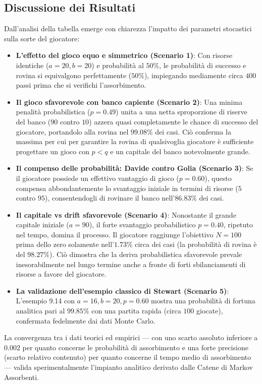 \documentclass[11pt,a4paper]{article}
\begin{document}
\subsection{Discussione dei Risultati}
Dall'analisi della tabella emerge con chiarezza l'impatto dei parametri stocastici sulla sorte del giocatore:
\begin{itemize}
    \item \textbf{L'effetto del gioco equo e simmetrico (Scenario 1)}: Con risorse identiche ($a=20, b=20$) e probabilità al $50\%$, le probabilità di successo e rovina si equivalgono perfettamente ($50\%$), impiegando mediamente circa $400$ passi prima che si verifichi l'assorbimento.
    \item \textbf{Il gioco sfavorevole con banco capiente (Scenario 2)}: Una minima penalità probabilistica ($p=0.49$) unita a una netta sproporzione di riserve del banco ($90$ contro $10$) azzera quasi completamente le chance di successo del giocatore, portandolo alla rovina nel $99.08\%$ dei casi. Ciò conferma la massima per cui per garantire la rovina di qualsivoglia giocatore è sufficiente progettare un gioco con $p < q$ e un capitale del banco notevolmente grande.
    \item \textbf{Il compenso delle probabilità: Davide contro Golia (Scenario 3)}: Se il giocatore possiede un effettivo vantaggio di gioco ($p=0.60$), questo compensa abbondantemente lo svantaggio iniziale in termini di risorse ($5$ contro $95$), consentendogli di rovinare il banco nell'$86.83\%$ dei casi.
    \item \textbf{Il capitale vs drift sfavorevole (Scenario 4)}: Nonostante il grande capitale iniziale ($a=90$), il forte svantaggio probabilistico $p=0.40$, ripetuto nel tempo, domina il processo. Il giocatore raggiunge l'obiettivo $N=100$ prima dello zero solamente nell'$1.73\%$ circa dei casi (la probabilità di rovina è del $98.27\%$). Ciò dimostra che la deriva probabilistica sfavorevole prevale inesorabilmente nel lungo termine anche a fronte di forti sbilanciamenti di risorse a favore del giocatore.
    \item \textbf{La validazione dell'esempio classico di Stewart (Scenario 5)}: L'esempio 9.14 con $a=16, b=20, p=0.60$ mostra una probabilità di fortuna analitica pari al $99.85\%$ con una partita rapida (circa $100$ giocate), confermata fedelmente dai dati Monte Carlo.
\end{itemize}

La convergenza tra i dati teorici ed empirici --- con uno scarto assoluto inferiore a $0.002$ per quanto concerne le probabilità di assorbimento e una forte precisione (scarto relativo contenuto) per quanto concerne il tempo medio di assorbimento --- valida sperimentalmente l'impianto analitico derivato dalle Catene di Markov Assorbenti.
\end{document}
